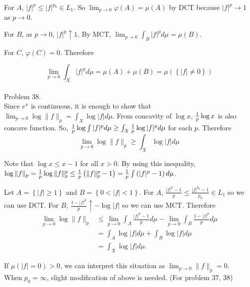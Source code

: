 For $A$, $|f|^p \leq |f|^{p_0} \in L_1$. So $\lim_{p \rightarrow 0} \varphi\left( A \right) = \mu\left( A \right)$ by DCT because $|f|^p \rightarrow 1$ as $p \rightarrow 0$.

For $B$, as $p \rightarrow 0$, $|f|^p \uparrow 1$. By MCT, $\lim_{p \rightarrow 0} \int_B |f|^p d\mu = \mu\left( B \right)$. 

For $C$, $\varphi\left( C \right) = 0$. Therefore

\begin{equation*}
	\lim_{p\rightarrow 0}\int_X |f|^p d\mu = \mu\left( A \right) + \mu\left( B \right) = \mu\left( \left\{ |f| \ne 0 \right\} \right)
\end{equation*}
\hfill \\

Problem 38. \\

Since $e^x$ is continuous, it is enough to show that $\lim_{p\rightarrow 0} \log \| f \|_p = \int_X \log |f| d\mu$. From concavity of $\log x$, ${1\over p} \log x$ is also concave function. So, ${1\over p}\log \int |f|^p d\mu \geq \int_X {1\over p}\log |f|^p d\mu$ for each $p$. Therefore
\begin{equation*}
	\lim_{p \rightarrow 0} \log \|f \|_p \geq \int_X \log |f| d\mu
	\label{<+label+>}
\end{equation*}

Note that $\log x \leq x-1$ for all $x > 0$. By using this inequality, $\log \| f \|_p = {1\over p}\log \| f \|_p ^p \leq {1\over p}\left( \| f \|_p ^p - 1 \right) = {1\over p}\int\left( |f|^p -1 \right)d\mu$.

Let $A = \left\{ |f| \geq 1 \right\}$ and $B = \left\{ 0 < |f| < 1 \right\}$. For $A$, $\frac{|f|^p - 1}{p} \leq \frac{|f|^{p_0} - 1}{p_0}\in L_1$ so we can use DCT. For $B$, $\frac{1-|f|^p}{p} \uparrow -\log|f|$ so we can use MCT. Therefore
\begin{equation*}
	\begin{split}
		\lim_{p\rightarrow 0} \log \| f \|_p & \leq \lim_{p \rightarrow 0} \int_A \frac{|f|^p - 1}{p}d\mu - \lim_{p\rightarrow 0}\int_B \frac{1-|f|^p}{p}d\mu \\
		& = \int_A \log |f| d\mu + \int_B \log |f| d\mu \\
		& = \int_X \log |f| d\mu.
	\end{split}
	\label{<+label+>}
\end{equation*}

If $\mu\left( |f| = 0 \right) > 0$, we can interpret this situation as $\lim_{p\rightarrow 0} \| f\|_p = 0$.\\ 

When $p_0 = \infty$, slight modification of above is needed. (For problem 37, 38)
